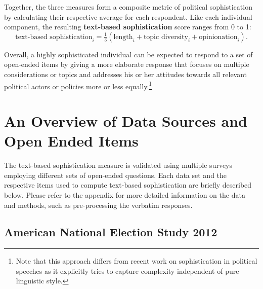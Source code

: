 \documentclass[12pt]{article}
\begin{document}
Together, the three measures form a composite metric of political sophistication by calculating their respective average for each respondent. Like each individual component, the resulting \textbf{text-based sophistication} score ranges from 0 to 1:
\begin{equation}
\text{text-based sophistication}_i = \tfrac{1}{3}(\text{length}_i + \text{topic diversity}_i + \text{opinionation}_i).
\end{equation}

Overall, a highly sophisticated individual can be expected to respond to a set of open-ended items by giving a more elaborate response that focuses on multiple considerations or topics and addresses his or her attitudes towards all relevant political actors or policies more or less equally.\footnote{Note that this approach differs from recent work on sophistication in political speeches \citep[e.g.,][]{spirling2016democratization} as it explicitly tries to capture complexity independent of pure linguistic style.}





\section*{An Overview of Data Sources and Open Ended Items}

The text-based sophistication measure is validated using multiple surveys employing different sets of open-ended questions. Each data set and the respective items used to compute text-based sophistication are briefly described below. Please refer to the appendix for more detailed information on the data and methods, such as pre-processing the verbatim responses.



\subsection*{American National Election Study 2012}
\end{document}

